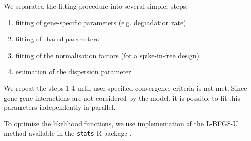 We separated the fitting procedure into several simpler steps:
\begin{enumerate}
 \item fitting of gene-specific parameters (e.g. degradation rate)
 \item fitting of shared parameters  
 \item fitting of the normalisation factors (for a spike-in-free design)
 \item estimation of the dispersion parameter 
\end{enumerate}
We repeat the steps 1-4 until
user-specified convergence criteria is not met.
 Since gene-gene interactions are not considered by the model, it is possible to 
 fit this parameters independently in parallel. 

To optimise the likelihood functions, 
we use implementation of the {L-BFGS-U} method \citep{byrd1995limited} 
available in the \verb|stats| R package \citep{rlang}.